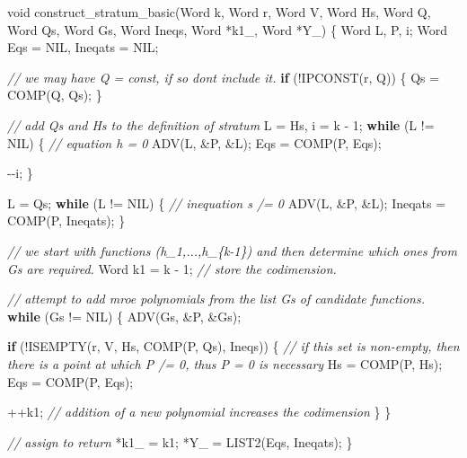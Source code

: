 \documentclass[
]{book}
\newenvironment{Shaded}{\begin{snugshade}}{\end{snugshade}}
\newcommand{\CommentTok}[1]{\textcolor[rgb]{0.56,0.35,0.01}{\textit{#1}}}
\newcommand{\ControlFlowTok}[1]{\textcolor[rgb]{0.13,0.29,0.53}{\textbf{#1}}}
\newcommand{\DataTypeTok}[1]{\textcolor[rgb]{0.13,0.29,0.53}{#1}}
\newcommand{\DecValTok}[1]{\textcolor[rgb]{0.00,0.00,0.81}{#1}}
\newcommand{\NormalTok}[1]{#1}
\theoremstyle{definition}
\theoremstyle{definition}
\theoremstyle{definition}
\theoremstyle{definition}
\theoremstyle{remark}
\begin{document}
\begin{Shaded}
\begin{Highlighting}[numbers=left,,]
\DataTypeTok{void}\NormalTok{ construct\_stratum\_basic(Word k, Word r, Word V, Word Hs, Word Q, Word Qs, Word Gs, Word Ineqs, Word *k1\_, Word *Y\_)}
\NormalTok{\{}
\NormalTok{    Word L, P, i;}
\NormalTok{    Word Eqs = NIL, Ineqats = NIL;}

    \CommentTok{// we may have Q = const, if so don\textquotesingle{}t include it.}
    \ControlFlowTok{if}\NormalTok{ (!IPCONST(r, Q)) \{}
\NormalTok{        Qs = COMP(Q, Qs);}
\NormalTok{    \}}

    \CommentTok{// add Qs and Hs to the definition of stratum}
\NormalTok{    L = Hs, i = k {-} }\DecValTok{1}\NormalTok{;}
    \ControlFlowTok{while}\NormalTok{ (L != NIL) \{}
        \CommentTok{// equation h = 0}
\NormalTok{        ADV(L, \&P, \&L);}
\NormalTok{        Eqs = COMP(P, Eqs);}

\NormalTok{       {-}{-}i;}
\NormalTok{    \}}

\NormalTok{    L = Qs;}
    \ControlFlowTok{while}\NormalTok{ (L != NIL) \{}
        \CommentTok{// inequation s /= 0}
\NormalTok{        ADV(L, \&P, \&L);}
\NormalTok{        Ineqats = COMP(P, Ineqats);}
\NormalTok{    \}}

    \CommentTok{// we start with functions (h\_1,...,h\_\{k{-}1\}) and then determine which ones from Gs are required.}
\NormalTok{    Word k1 = k {-} }\DecValTok{1}\NormalTok{; }\CommentTok{// store the codimension.}

    \CommentTok{// attempt to add mroe polynomials from the list Gs of candidate functions.}
    \ControlFlowTok{while}\NormalTok{ (Gs != NIL) \{}
\NormalTok{        ADV(Gs, \&P, \&Gs);}

        \ControlFlowTok{if}\NormalTok{ (!ISEMPTY(r, V, Hs, COMP(P, Qs), Ineqs)) \{}
            \CommentTok{// if this set is non{-}empty, then there is a point at which P /= 0, thus P = 0 is necessary}
\NormalTok{            Hs = COMP(P, Hs);}
\NormalTok{            Eqs = COMP(P, Eqs);}

\NormalTok{            ++k1; }\CommentTok{// addition of a new polynomial increases the codimension}
\NormalTok{        \}}
\NormalTok{    \}}

    \CommentTok{// assign to return}
\NormalTok{    *k1\_ = k1;}
\NormalTok{    *Y\_ = LIST2(Eqs, Ineqats);}
\NormalTok{\}}
\end{Highlighting}
\end{Shaded}
\end{document}
